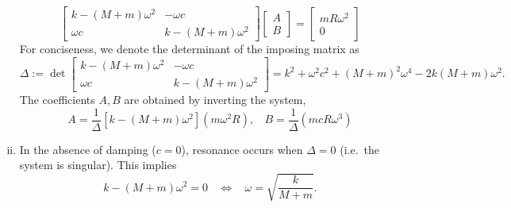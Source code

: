 \begin{enumerate}[(i)]
{    \begin{equation}
        \begin{bmatrix}
            k - (M+m)\omega^2 & - \omega c \\
            \omega c & k - (M+m)\omega^2 
        \end{bmatrix} 
        \begin{bmatrix}
            A \\ B
        \end{bmatrix} = 
        \begin{bmatrix}
            m R \omega^2 \\ 0
        \end{bmatrix}
    \end{equation}
    For conciseness, we denote the determinant of the imposing matrix as 
    \begin{equation}\label{eqn:hw1_p2_det}
        \Delta := \det \begin{bmatrix}
            k - (M+m)\omega^2 & - \omega c \\
            \omega c & k - (M+m)\omega^2
        \end{bmatrix} = k^2 + \omega^2 c^2 + {(M+m)}^2 \omega^4 - 2k(M+m)\omega^2.
    \end{equation}
    The coefficients $A, B$ are obtained by inverting the system,
    \begin{equation}
       \boxed{ A = \frac{1}{\Delta} \left[k - (M+m) \omega^2 \right](m\omega^2 R), ~~~~ B = \frac{1}{\Delta} \left( m c R \omega^3 \right) }
    \end{equation}
}
\item { %
    In the absence of damping ($c = 0$), resonance occurs when $\Delta = 0$ (i.e.~the system is singular).
    This implies 
    \begin{equation}
        k - (M + m) \omega^2 = 0 ~~~~ \Leftrightarrow ~~~~ \boxed{\omega = \sqrt{\frac{k}{M+m}}}.
    \end{equation}

}
\end{enumerate}

